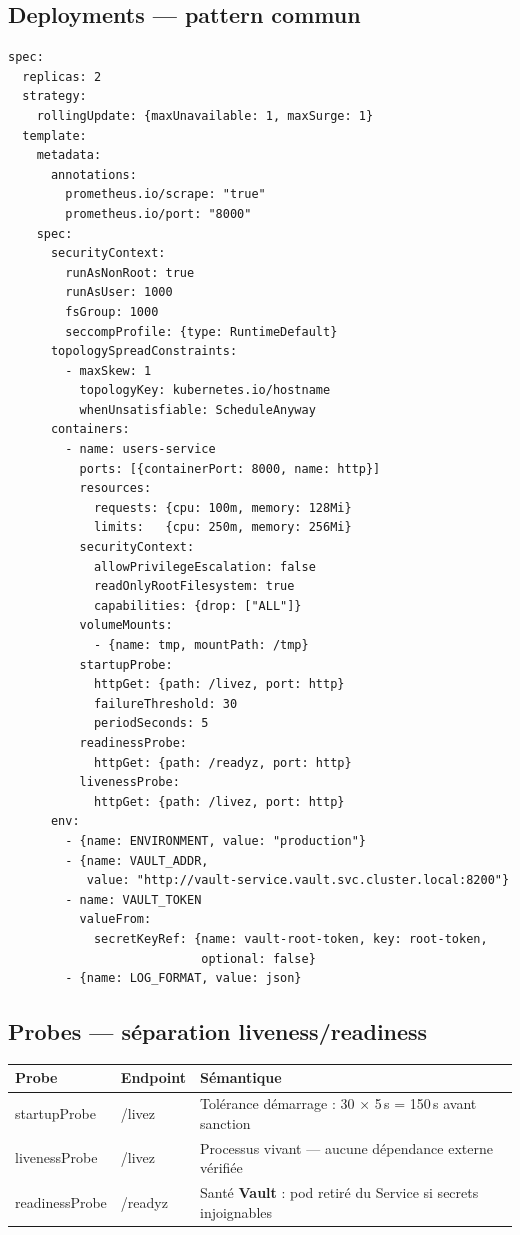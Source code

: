 \documentclass[12pt,a4paper]{article}
\begin{document}
\subsection{Deployments --- pattern commun}
\begin{lstlisting}[caption={Deployment users-service --- extraits significatifs}]
spec:
  replicas: 2
  strategy:
    rollingUpdate: {maxUnavailable: 1, maxSurge: 1}
  template:
    metadata:
      annotations:
        prometheus.io/scrape: "true"
        prometheus.io/port: "8000"
    spec:
      securityContext:
        runAsNonRoot: true
        runAsUser: 1000
        fsGroup: 1000
        seccompProfile: {type: RuntimeDefault}
      topologySpreadConstraints:
        - maxSkew: 1
          topologyKey: kubernetes.io/hostname
          whenUnsatisfiable: ScheduleAnyway
      containers:
        - name: users-service
          ports: [{containerPort: 8000, name: http}]
          resources:
            requests: {cpu: 100m, memory: 128Mi}
            limits:   {cpu: 250m, memory: 256Mi}
          securityContext:
            allowPrivilegeEscalation: false
            readOnlyRootFilesystem: true
            capabilities: {drop: ["ALL"]}
          volumeMounts:
            - {name: tmp, mountPath: /tmp}
          startupProbe:
            httpGet: {path: /livez, port: http}
            failureThreshold: 30
            periodSeconds: 5
          readinessProbe:
            httpGet: {path: /readyz, port: http}
          livenessProbe:
            httpGet: {path: /livez, port: http}
      env:
        - {name: ENVIRONMENT, value: "production"}
        - {name: VAULT_ADDR,
           value: "http://vault-service.vault.svc.cluster.local:8200"}
        - name: VAULT_TOKEN
          valueFrom:
            secretKeyRef: {name: vault-root-token, key: root-token,
                           optional: false}
        - {name: LOG_FORMAT, value: json}
\end{lstlisting}

\subsection{Probes --- séparation liveness/readiness}
\begin{tabular}{@{}llp{8.4cm}@{}}
\toprule
\textbf{Probe} & \textbf{Endpoint} & \textbf{Sémantique} \\
\midrule
startupProbe & /livez & Tolérance démarrage : 30 × 5\,s = 150\,s avant sanction \\
livenessProbe & /livez & Processus vivant --- aucune dépendance externe vérifiée \\
readinessProbe & /readyz & Santé \textbf{Vault} : pod retiré du Service si secrets injoignables \\
\bottomrule
\end{tabular}
\end{document}
